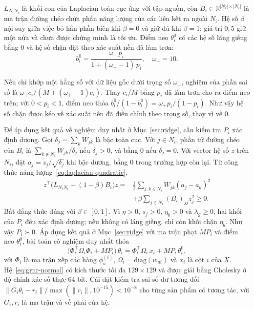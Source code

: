 $L_{N_iN_i}$ là khối con của Laplacian toàn cục ứng với tập nguồn, còn $B_i\in\mathbb{R}^{|N_i|\times|N_i|}$ là ma trận đường chéo chứa phần năng lượng của các liên kết ra ngoài $N_i$. Hệ số $\beta$ nội suy giữa việc bỏ hẳn phần biên khi $\beta=0$ và giữ đủ khi $\beta=1$; giá trị $0{,}5$ giữ một nửa và chưa được chứng minh là tối ưu. Điểm neo $\theta_i^0$ có các hệ số láng giềng bằng 0 và hệ số chặn đặt theo xác suất nền đã làm trơn:
\begin{equation}
b_i^0 = \frac{\omega_+\,p_i}{1+(\omega_+-1)\,p_i}, \quad \omega_+=10.
\end{equation}

Nếu chỉ khớp một hằng số với dữ liệu gốc dưới trọng số $\omega_+$, nghiệm của phần sai số là $\omega_+c_i/(M+(\omega_+-1)c_i)$. Thay $c_i/M$ bằng $p_i$ đã làm trơn cho ra điểm neo trên; với $0<p_i<1$, điểm neo thỏa $b_i^0/(1-b_i^0)=\omega_+p_i/(1-p_i)$. Như vậy hệ số chặn được kéo về xác suất nền đã điều chỉnh theo trọng số, thay vì về 0.

Để áp dụng kết quả về nghiệm duy nhất ở Mục~\ref{sec:ridge}, cần kiểm tra $P_i$ xác định dương. Gọi $\delta_j=\sum_kW_{jk}$ là bậc toàn cục. Với $j\in N_i$, phần tử đường chéo của $B_i$ là $\sum_{k\notin N_i}W_{jk}/\delta_j$ nếu $\delta_j>0$, và bằng 0 nếu $\delta_j=0$. Với vector hệ số $z$ trên $N_i$, đặt $a_j=z_j/\sqrt{\delta_j}$ khi bậc dương, bằng 0 trong trường hợp còn lại. Từ công thức năng lượng~\eqref{eq:laplacian-quadratic},
\begin{equation}
\begin{aligned}
z^\top\bigl(L_{N_iN_i}-(1-\beta)B_i\bigr)z
={}&\frac12\sum_{j,k\in N_i}W_{jk}(a_j-a_k)^2\\
&+\beta\sum_{j\in N_i}(B_i)_{jj}z_j^2\ge0.
\end{aligned}
\label{eq:grnr-penalty-energy}
\end{equation}
Bất đẳng thức đúng với $\beta\in[0,1]$. Vì $\eta>0$, $s_j>0$, $\eta_b>0$ và $\lambda_g\ge0$, hai khối của $P_i$ đều xác định dương; nếu không có láng giềng, chỉ còn khối chặn $\eta_b$. Như vậy $P_i\succ0$. Áp dụng kết quả ở Mục~\ref{sec:ridge} với ma trận phạt $MP_i$ và điểm neo $\theta_i^0$, bài toán có nghiệm duy nhất thỏa
\begin{equation}
\bigl(\Phi_i^\top \Omega_i \Phi_i + M P_i\bigr)\,\theta_i = \Phi_i^\top \Omega_i\, x_i + M P_i\,\theta_i^0,
\label{eq:grnr-normal}
\end{equation}
với $\Phi_i$ là ma trận xếp các hàng $\phi_u^{(i)}$, $\Omega_i=\mathrm{diag}(w_{ui})$ và $x_i$ là cột $i$ của $X$. Hệ~\eqref{eq:grnr-normal} có kích thước tối đa $129\times129$ và được giải bằng Cholesky ở độ chính xác số thực 64 bit. Cài đặt kiểm tra sai số dư tương đối $\|G_i\theta_i-r_i\|/\max(\|r_i\|,10^{-15})<10^{-8}$ cho từng sản phẩm có tương tác, với $G_i,r_i$ là ma trận và vế phải của hệ.

